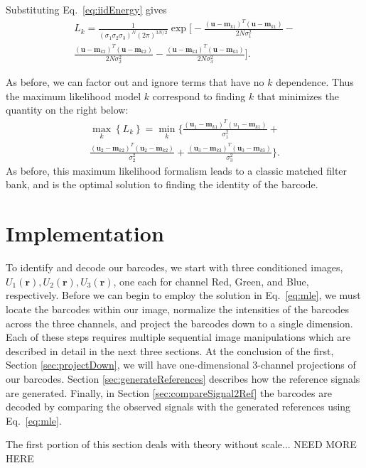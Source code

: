 Substituting Eq.~\ref{eq:iidEnergy} gives
\begin{multline}
L_k=\frac{1}{ (\sigma_1\sigma_2\sigma_3)^N  (2\pi)^{3N/2}  }  \exp\Bigg[ -\frac{(\mathbf{u}-\mathbf{m}_{k1})^T(\mathbf{u}-\mathbf{m}_{k1})} {2 N \sigma_1^2 }   - \\ \frac{(\mathbf{u}-\mathbf{m}_{k2})^T(\mathbf{u}-\mathbf{m}_{k2})} {2 N \sigma_2^2 } -\frac{(\mathbf{u}-\mathbf{m}_{k3})^T(\mathbf{u}-\mathbf{m}_{k3})} {2 N \sigma_3^2 }    \Bigg].
\end{multline}

As before, we can factor out and ignore terms that have no $k$ dependence. Thus the maximum likelihood model $k$ correspond to finding $k$ that minimizes the quantity on the right below:
\begin{multline}\label{eq:mle}
\max_k   \left\{ L_k \right\} =  \min_k  \Bigg\{  \frac{(\mathbf{u}_1-\mathbf{m}_{k1})^T(u_1-\mathbf{m}_{k1})}{\sigma_1^2} +\\  
\frac{(\mathbf{u}_2-\mathbf{m}_{k2})^T(\mathbf{u}_2-\mathbf{m}_{k2})}{\sigma_2^2} + \frac{(\mathbf{u}_3-\mathbf{m}_{k3})^T(\mathbf{u}_3-\mathbf{m}_{k3})}{\sigma_3^2} \Bigg\}. 
\end{multline}
As before, this maximum likelihood formalism leads to a classic matched filter bank, and is the optimal solution to finding the identity of the barcode.

\section{Implementation}
To identify and decode our barcodes, we start with three conditioned images, $U_1(\mathbf{r}), U_2(\mathbf{r}), U_3(\mathbf{r})$, one each for channel Red, Green, and Blue, respectively.  Before we can begin to employ the solution in Eq.~\ref{eq:mle}, we must locate the barcodes within our image, normalize the intensities of the barcodes across the three channels, and project the barcodes down to a single dimension. Each of these steps requires multiple sequential image manipulations which are described in detail in the next three sections. At the conclusion of the first, Section \ref{sec:projectDown}, we will  have one-dimensional 3-channel projections of our barcodes. Section \ref{sec:generateReferences} describes how the reference signals are generated. Finally, in Section \ref{sec:compareSignal2Ref} the barcodes are decoded by comparing the observed signals with the generated references  using Eq.~\ref{eq:mle}.

The first  portion of this section deals with theory without scale... NEED MORE HERE

